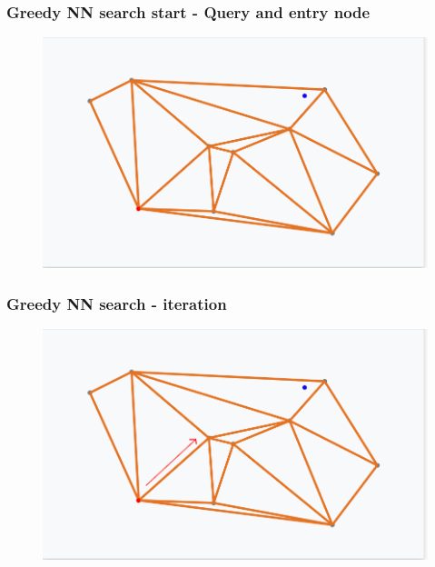 \documentclass{beamer}
\begin{document}
  \begin{frame}
    \frametitle{Greedy NN search start - Query and entry node}  
  \begin{figure}[greedy_search_start_new]
    \vspace*{-0.1cm}
  	\includegraphics[scale=0.3]{greedy_search_start_new} 	
  \end{figure} 
  \end{frame} 
  

  \begin{frame}
    \frametitle{Greedy NN search - iteration}  
  \begin{figure}[greedy_search_start_new_step_1_1]
    \vspace*{-0.1cm}
  	\includegraphics[scale=0.3]{greedy_search_start_new_step_1_1} 	
  \end{figure} 
  \end{frame}   
  
\end{document}
